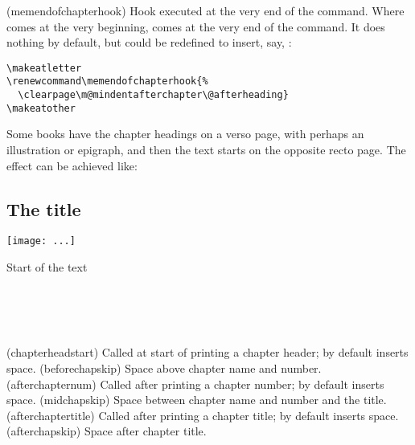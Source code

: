\begin{syntax}
\cmd{\memendofchapterhook}
\end{syntax}
\glossary(memendofchapterhook)%
  {}%
  {Hook executed at the very end of the  command.}
Where \cmd{\clearforchapter} comes at the very beginning,
\cmd{\memendofchapterhook} comes at the very end of the \cmd{\chapter}
command. It does nothing by default, but could be redefined to insert,
say, \cmd{\clearpage}:
\begin{verbatim}
\makeatletter
\renewcommand\memendofchapterhook{%
  \clearpage\m@mindentafterchapter\@afterheading}
\makeatother
\end{verbatim}


    Some books have the chapter headings on a verso page, with perhaps
an illustration or epigraph, and
then the text starts on the opposite
recto page. The effect can be achieved like:
\begin{lcode}
\openleft                %
\chapter{The title}      %
\begin{centering}        %
\texttt{[image: ...]}
\end{centering}
\clearpage               %
Start of the text        %
\end{lcode}


\begin{syntax}
\cmd{\chapterheadstart} \lnc{\beforechapskip} \\
\cmd{\afterchapternum} \lnc{\midchapskip} \\
\cmd{\afterchaptertitle} \lnc{\afterchapskip} \\
\end{syntax}
\glossary(chapterheadstart)%
  {}%
  {Called at start of printing a chapter header; by default inserts  space.}
\glossary(beforechapskip)%
  {}%
  {Space above chapter name and number.}
\glossary(afterchapternum)%
  {}%
  {Called after printing a chapter number; by default inserts  space.}
\glossary(midchapskip)%
  {}%
  {Space between chapter name and number and the title.}
\glossary(afterchaptertitle)%
  {}%
  {Called after printing a chapter title; by default inserts  space.}
\glossary(afterchapskip)%
  {}%
  {Space after chapter title.}

